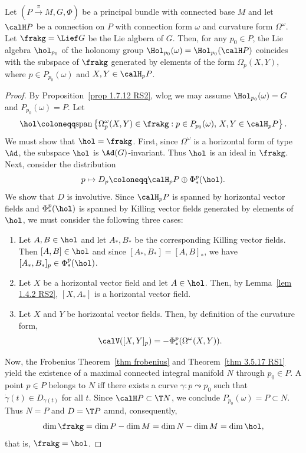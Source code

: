 \begin{thm}\label{thm 1.7.15 RS2 Ambrose-Singer}
    Let $(P\overset{\pi}{\to}M,G,\Phi)$ be a principal bundle with connected base $M$ and let $\calH P$ be a connection on $P$ with connection form $\omega$ and curvature form $\Omega^\omega$. Let $\frakg=\Lief G$ be the Lie algbera of $G$. Then, for any $p_0\in P$, the Lie algebra $\hol_{p_0}$ of the holonomy group $\Hol_{p_0}(\omega)=\Hol_{p_0}(\calH P)$ coincides with the subspace of $\frakg$ generated by elements of the form $\Omega_p(X,Y)$, where $p\in P_{p_0}(\omega)$ and $X,Y\in\calH_p P$.
\end{thm}
\begin{proof}
    By Proposition~\ref{prop 1.7.12 RS2}, \gls{wlog} we may assume $\Hol_{p_0}(\omega)=G$ and $P_{p_0}(\omega)=P$. Let
    \[\hol\coloneqq \mathrm{span}\left\{\Omega^\omega_p(X,Y)\in\frakg : p\in P_{p_0}(\omega),\, X,Y\in\calH_p P\right\}.\]
    We must show that $\hol=\frakg$. First, since $\Omega^\omega$ is a horizontal form of type $\Ad$, the subspace $\hol$ is $\Ad(G)$-invariant. Thus $\hol$ is an ideal in $\frakg$. Next, consider the distribution
    \[p\mapsto D_p\coloneqq \calH_pP \oplus \Phi^p_\ast(\hol).\]
    We show that $D$ is involutive. Since $\calH_p P$ is spanned by horizontal vector fields and $\Phi^p_\ast(\hol)$ is spanned by Killing vector fields generated by elements of $\hol$, we must consider the following three cases:
    \begin{enumerate}[label=(\alph*)]
        \item Let $A,B\in\hol$ and let  $A_\ast,B_\ast$ be the corresponding Killing vector fields. Then $[A,B]\in\hol$ and since $[A_\ast,B_\ast]=[A,B]_\ast$, we have $[A_\ast,B_\ast]_p\in \Phi^p_\ast(\hol)$.
        \item Let $X$ be a horizontal vector field and let $A\in\hol$. Then, by Lemma~\ref{lem 1.4.2 RS2}, $[X,A_\ast]$ is a horizontal vector field.
        \item Let $X$ and $Y$ be horizontal vector fields. Then, by definition of the curvature form,
        \[\calV([X,Y]_p)=-\Phi^p_\ast(\Omega^\omega(X,Y)).\]
    \end{enumerate}
    Now, the Frobenius Theorem~\ref{thm frobenius} and Theorem~\ref{thm 3.5.17 RS1} yield the existence of a maximal connected integral manifold $N$ through $p_0\in P$. A point $p\in P$ belongs to $N$ iff there exists a curve $\gamma:p\leadsto p_0$ such that $\dot\gamma(t)\in D_{\gamma(t)}$ for all $t$. Since $\calH P\subset \T N$, we conclude $P_{p_0}(\omega)=P\subset N$. Thus $N=P$ and $D=\T P$ amnd, consequently,
    \[\dim\frakg=\dim P-\dim M=\dim N-\dim M=\dim\hol,\]
    that is, $\frakg=\hol$.
\end{proof}

